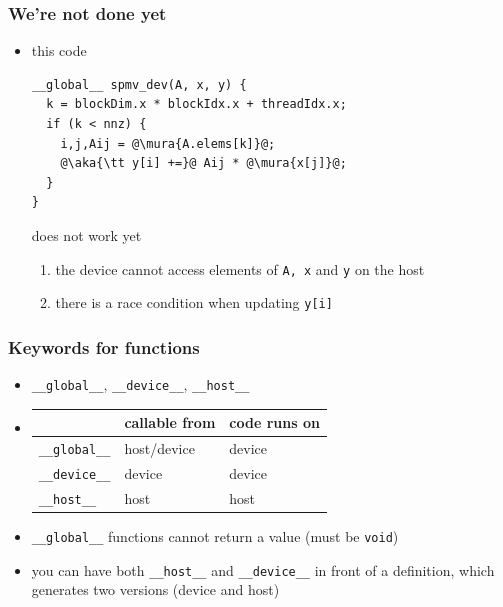 \documentclass[12pt,dvipdfmx]{beamer}
\newcommand{\mura}[1]{{\color{purple}#1}}
\newcommand{\aka}[1]{{\color{red}#1}}
\begin{document}
\begin{frame}[fragile]
\frametitle{We're not done yet}
\begin{itemize}
\item this code
\begin{lstlisting}
__global__ spmv_dev(A, x, y) {
  k = blockDim.x * blockIdx.x + threadIdx.x;
  if (k < nnz) {
    i,j,Aij = @\mura{A.elems[k]}@;
    @\aka{\tt y[i] +=}@ Aij * @\mura{x[j]}@;
  }
}
\end{lstlisting}
does not work yet

\begin{enumerate}
\item the device \mura{cannot access elements}
  of {\tt A, x} and {\tt y} on the host
\item there is a race condition when updating \aka{\tt y[i]}
\end{enumerate}
\end{itemize}
\end{frame}

\begin{frame}[fragile]
  \frametitle{Keywords for functions}
\begin{itemize}
\item {\tt \_\_global\_\_}, {\tt \_\_device\_\_}, {\tt \_\_host\_\_}
\item []
  \begin{tabular}{|l|l|l|}\hline
     & callable from & code runs on \\\hline
    {\tt \_\_global\_\_} & host/device & device \\
    {\tt \_\_device\_\_} & device      & device \\
    {\tt \_\_host\_\_}   & host        & host   \\\hline
  \end{tabular}

\item {\tt \_\_global\_\_} functions cannot return a value
  (must be {\tt void})

\item you can have both {\tt \_\_host\_\_} and {\tt \_\_device\_\_}
  in front of a definition, which
  generates two versions (device and host)
\end{itemize}
\end{frame}
\end{document}
